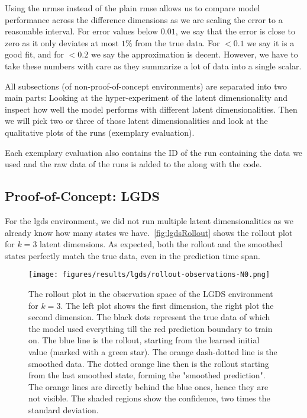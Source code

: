 	Using the \ac{nrmse} instead of the plain \ac{rmse} allows us to compare model performance across the difference dimensions as we are scaling the error to a reasonable interval. For error values below \( 0.01 \), we say that the error is close to zero as it only deviates at most \(1\%\) from the true data. For \(<0.1\) we say it is a good fit, and for \(<0.2\) we say the approximation is decent. However, we have to take these numbers with care as they summarize a lot of data into a single scalar.

	All subsections (of non-proof-of-concept environments) are separated into two main parts: Looking at the hyper-experiment of the latent dimensionality and inspect how well the model performs with different latent dimensionalities. Then we will pick two or three of those latent dimensionalities and look at the qualitative plots of the runs (exemplary evaluation).

	Each exemplary evaluation also contains the ID of the run containing the data we used and the raw data of the runs is added to the  along with the code.

	\subsection{Proof-of-Concept: LGDS}
		For the \ac{lgds} environment, we did not run multiple latent dimensionalities as we already know how many states we have.~\autoref{fig:lgdsRollout} shows the rollout plot for \( k = 3 \) latent dimensions. As expected, both the rollout and the smoothed states perfectly match the true data, even in the prediction time span.

		\begin{figure}
			\centering
			\texttt{[image: figures/results/lgds/rollout-observations-N0.png]}
			\caption[Rollout of the proof-of-concept LGDS experiment for 3 latent dimensions]{The rollout plot in the observation space of the LGDS environment for \(k = 3\). The left plot shows the first dimension, the right plot the second dimension. The black dots represent the true data of which the model used everything till the red prediction boundary to train on. The blue line is the rollout, starting from the learned initial value (marked with a green star). The orange dash-dotted line is the smoothed data. The dotted orange line then is the rollout starting from the last smoothed state, forming the "smoothed prediction". The orange lines are directly behind the blue ones, hence they are not visible. The shaded regions show the confidence, \ie two times the standard deviation.}
			\label{fig:lgdsRollout}
		\end{figure}

